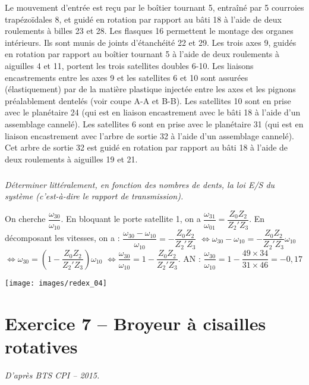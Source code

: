 \documentclass[10pt,fleqn]{article} %
\begin{document}
\begin{multicols}{2}
\begin{multicols}{2}
Le mouvement d’entrée est reçu par le boîtier tournant 5, entraîné par 5 courroies trapézoïdales 8, et guidé en rotation par rapport au bâti 18 à l’aide de deux roulements à billes 23 et 28. 
Les flasques 16 permettent le montage des organes intérieurs. Ils sont munis de joints d’étanchéité 22 et 29. 
Les trois axes 9, guidés en rotation par rapport au boîtier tournant 5 à l’aide de deux roulements à aiguilles 4 et 11, portent les trois satellites doubles 6-10.
Les liaisons encastrements entre les axes 9 et les satellites 6 et 10 sont assurées (élastiquement) par de la matière plastique injectée entre les axes et les pignons préalablement dentelés (voir coupe A-A et B-B). 
Les satellites 10 sont en prise avec le planétaire 24 (qui est en liaison encastrement avec le bâti 18 à l’aide d’un assemblage cannelé).
Les satellites 6 sont en prise avec le planétaire 31 (qui est en liaison encastrement avec l’arbre de sortie 32 à l’aide d’un assemblage cannelé). Cet arbre de sortie 32 est guidé en rotation par rapport au bâti 18 à l’aide de deux roulements à aiguilles 19 et 21.

\fi

\subparagraph{}
\textit{Déterminer littéralement, en fonction des nombres de dents, la loi E/S du système (c'est-à-dire le rapport de transmission).}

\ifprof
\begin{corrige}
On cherche $\dfrac{\omega_{30}}{\omega_{10}}$. En bloquant le porte satellite 1, on a  
$\dfrac{\omega_{31}}{\omega_{01}}=\dfrac{Z_0 Z_2 }{Z_2' Z_3}$. En décomposant les vitesses, on a :
$\dfrac{\omega_{30}-\omega_{10}}{\omega_{10}}=-\dfrac{Z_0 Z_2 }{Z_2' Z_3}$
$\Leftrightarrow \omega_{30}-\omega_{10}=-\dfrac{Z_0 Z_2 }{Z_2' Z_3}\omega_{10}$
$\Leftrightarrow \omega_{30}=\left(1-\dfrac{Z_0 Z_2 }{Z_2' Z_3}\right)\omega_{10}$
$\Leftrightarrow \dfrac{\omega_{30}}{\omega_{10}}=1-\dfrac{Z_0 Z_2 }{Z_2' Z_3}$.
AN : $ \dfrac{\omega_{30}}{\omega_{10}}=1-\dfrac{49 \times 34}{31 \times 46}=-0,17$
\end{corrige}
\else
\fi

%
%
%
\ifprof
\else
\begin{center}
\texttt{[image: images/redex\_04]}
\end{center}
\fi



\section*{Exercice 7 -- {Broyeur à cisailles rotatives}}
\setcounter{exo}{0}
\textit{D'après BTS CPI -- 2015.}


\end{multicols}
\end{multicols}
\end{document}
